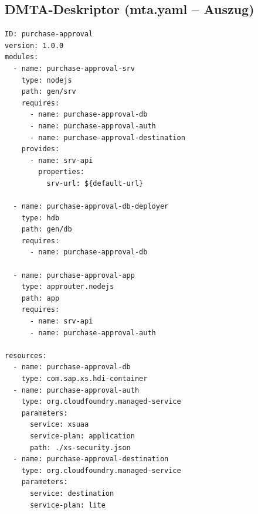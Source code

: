 \subsection*{D\quad MTA-Deskriptor (mta.yaml -- Auszug)}
\begin{lstlisting}[caption={MTA-Deskriptor mit Modulen und Ressourcen},label={lst:anhang-mta}]
ID: purchase-approval
version: 1.0.0
modules:
  - name: purchase-approval-srv
    type: nodejs
    path: gen/srv
    requires:
      - name: purchase-approval-db
      - name: purchase-approval-auth
      - name: purchase-approval-destination
    provides:
      - name: srv-api
        properties:
          srv-url: ${default-url}

  - name: purchase-approval-db-deployer
    type: hdb
    path: gen/db
    requires:
      - name: purchase-approval-db

  - name: purchase-approval-app
    type: approuter.nodejs
    path: app
    requires:
      - name: srv-api
      - name: purchase-approval-auth

resources:
  - name: purchase-approval-db
    type: com.sap.xs.hdi-container
  - name: purchase-approval-auth
    type: org.cloudfoundry.managed-service
    parameters:
      service: xsuaa
      service-plan: application
      path: ./xs-security.json
  - name: purchase-approval-destination
    type: org.cloudfoundry.managed-service
    parameters:
      service: destination
      service-plan: lite
\end{lstlisting}
